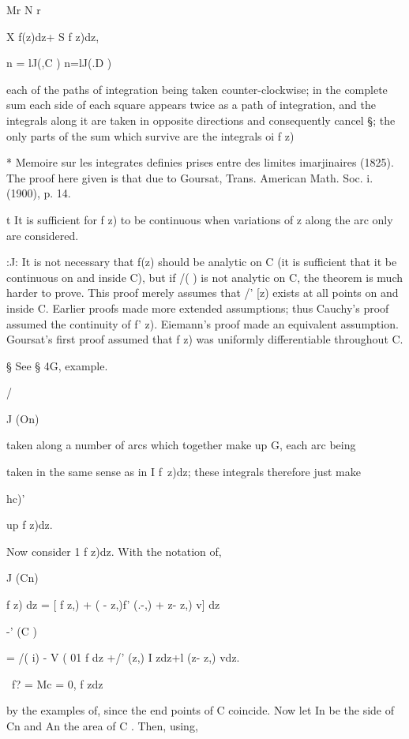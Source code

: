 Mr N r

X f(z)dz+ S f z)dz,

n = lJ(,C ) n=lJ(.D )

each of the paths of integration being taken counter-clockwise; in
the complete sum each side of each square appears twice as a path of
integration, and the integrals along it are taken in opposite
directions and consequently cancel §; the only parts of the sum which
survive are the integrals oi f z)

* Memoire sur les integrates definies prises entre des limites
imarjinaires (1825). The proof here given is that due to Goursat,
Trans. American Math. Soc. i. (1900), p. 14.

t It is sufficient for f z) to be continuous when variations of z
along the arc only are considered.

:J: It is not necessary that f(z) should be analytic on C (it is
sufficient that it be continuous on and inside C), but if /( ) is not
analytic on C, the theorem is much harder to prove. This proof merely
assumes that /' [z) exists at all points on and inside C. Earlier
proofs made more extended assumptions; thus Cauchy's proof assumed the
continuity of f' z). Eiemann's proof made an equivalent assumption.
Goursat's first proof assumed that f z) was uniformly differentiable
throughout C.

§ See § 4G, example.

/

J (On)

%
%

taken along a number of arcs which together make up G, each arc being

taken in the same sense as in I f\ z)dz; these integrals therefore
just make

hc)'

up f z)dz.

Now consider 1 f z)dz. With the notation of,

J (Cn)

f z) dz = [ f z,) + ( - z,)f' (.-,) + z- z,) v] dz

-' (C )

= /( i) - V ( 01 f dz +/' (z,) I zdz+l (z- z,) vdz.

\ f? = Mc = 0, f zdz

by the examples of, since the end points of C coincide. Now let
In be the side of Cn and An the area of C . Then, using,

